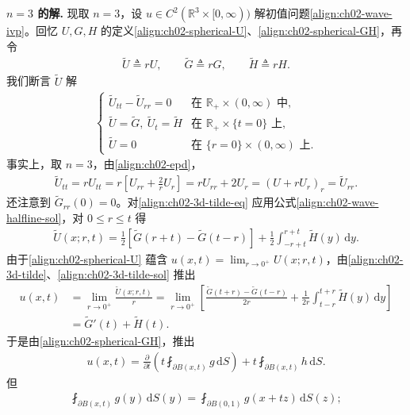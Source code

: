 \documentclass[../../main.tex]{subfiles}
\begin{document}
\textbf{$n=3$ 的解.} 现取 $n=3$，设 $u\in C^2(\mathbb{R}^3\times[0,\infty))$ 解初值问题\eqref{align:ch02-wave-ivp}。回忆 $U,G,H$ 的定义\eqref{align:ch02-spherical-U}、\eqref{align:ch02-spherical-GH}，再令
\begin{align}\label{align:ch02-3d-tilde}
\widetilde{U}\triangleq rU,\qquad \widetilde{G}\triangleq rG,\qquad \widetilde{H}\triangleq rH.
\end{align}
我们断言 $\widetilde{U}$ 解
\begin{align}\label{align:ch02-3d-tilde-eq}
\begin{cases}
\widetilde{U}_{tt}-\widetilde{U}_{rr}=0 & \text{在 }\mathbb{R}_+\times(0,\infty)\text{ 中},\\
\widetilde{U}=\widetilde{G},\ \widetilde{U}_t=\widetilde{H} & \text{在 }\mathbb{R}_+\times\{t=0\}\text{ 上},\\
\widetilde{U}=0 & \text{在 }\{r=0\}\times(0,\infty)\text{ 上}.
\end{cases}
\end{align}
事实上，取 $n=3$，由\eqref{align:ch02-epd}，
\begin{align*}
\widetilde{U}_{tt}=rU_{tt}=r\left[U_{rr}+\frac{2}{r}U_r\right]=rU_{rr}+2U_r=(U+rU_r)_r=\widetilde{U}_{rr}.
\end{align*}
还注意到 $\widetilde{G}_{rr}(0)=0$。对\eqref{align:ch02-3d-tilde-eq} 应用公式\eqref{align:ch02-wave-halfline-sol}，对 $0\leqslant r\leqslant t$ 得
\begin{align}\label{align:ch02-3d-tilde-sol}
\widetilde{U}(x;r,t)=\frac{1}{2}[\widetilde{G}(r+t)-\widetilde{G}(t-r)]+\frac{1}{2}\int_{-r+t}^{r+t}\widetilde{H}(y)\,\mathrm{d}y.
\end{align}
由于\eqref{align:ch02-spherical-U} 蕴含 $u(x,t)=\lim_{r\to 0^+}U(x;r,t)$，由\eqref{align:ch02-3d-tilde}、\eqref{align:ch02-3d-tilde-sol} 推出
\begin{align*}
u(x,t)&=\lim_{r\to 0^+}\frac{\widetilde{U}(x;r,t)}{r}
=\lim_{r\to 0^+}\left[\frac{\widetilde{G}(t+r)-\widetilde{G}(t-r)}{2r}+\frac{1}{2r}\int_{t-r}^{t+r}\widetilde{H}(y)\,\mathrm{d}y\right]\\
&=\widetilde{G}'(t)+\widetilde{H}(t).
\end{align*}
于是由\eqref{align:ch02-spherical-GH}，推出
\begin{align}\label{align:ch02-kirchhoff-a}
u(x,t)=\frac{\partial}{\partial t}\left(t\fint_{\partial B(x,t)}g\,\mathrm{d}S\right)+t\fint_{\partial B(x,t)}h\,\mathrm{d}S.
\end{align}
但
\begin{align*}
\fint_{\partial B(x,t)}g(y)\,\mathrm{d}S(y)=\fint_{\partial B(0,1)}g(x+tz)\,\mathrm{d}S(z);
\end{align*}
\end{document}
